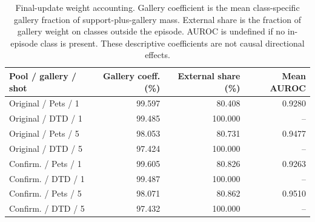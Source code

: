 \begin{table}[t]
\centering\small\setlength{\tabcolsep}{3pt}
\begin{tabular}{lrrr}
\toprule
Pool / gallery / shot & Gallery coeff. (\%) & External share (\%) & Mean AUROC \\ \midrule
Original / Pets / 1 & 99.597 & 80.408 & 0.9280 \\
Original / DTD / 1 & 99.485 & 100.000 & -- \\
Original / Pets / 5 & 98.053 & 80.731 & 0.9477 \\
Original / DTD / 5 & 97.424 & 100.000 & -- \\
Confirm. / Pets / 1 & 99.605 & 80.826 & 0.9263 \\
Confirm. / DTD / 1 & 99.487 & 100.000 & -- \\
Confirm. / Pets / 5 & 98.071 & 80.862 & 0.9510 \\
Confirm. / DTD / 5 & 97.432 & 100.000 & -- \\
\bottomrule\end{tabular}
\caption{Final-update weight accounting. Gallery coefficient is the mean class-specific gallery fraction of support-plus-gallery mass. External share is the fraction of gallery weight on classes outside the episode. AUROC is undefined if no in-episode class is present. These descriptive coefficients are not causal directional effects.}\label{tab:influence}
\end{table}
